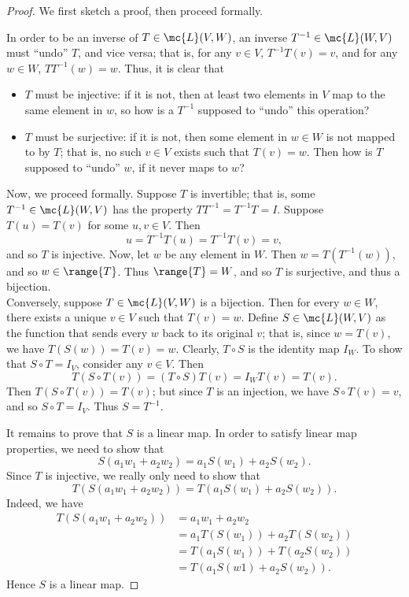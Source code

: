 \documentclass[math0540-lecture-notes.tex]{subfiles}
\begin{document}
\begin{proof}[Proof]
  We first sketch a proof, then proceed formally.

  In order to be an inverse of $T \in \mc{L}(V,W)$, an inverse $T ^{-1}\in \mc{L}(W,V)$ must
  ``undo'' $T$, and vice versa; that is, for any $v\in V$, $T^{-1}T(v)=v$, and for any $w\in W$,
  $TT^{-1}(w)=w$. Thus, it is clear that
  \begin{itemize}
    \item $T$ must be injective: if it is not, then at least two elements in $V$ map to the same
      element in $w$, so how is a $T^{-1}$ supposed to ``undo'' this operation?
    \item $T$ must be surjective: if it is not, then some element in $w\in W$ is not mapped to by
      $T$; that is, no such $v\in V$ exists such that $T(v)=w$. Then how is $T$ supposed to ``undo''
      $w$, if it never maps to $w$?
  \end{itemize}

  Now, we proceed formally. Suppose $T$ is invertible; that is, some $T^{-1}\in \mc{L}(W,V)$ has the
  property $TT^{-1}=T^{-1}T=I$. Suppose $T(u)=T(v)$ for some $u,v\in V$. Then \[
    u=T^{-1}T(u)=T^{-1}T(v)=v
  ,\] and so $T$ is injective. Now, let $w$ be any element in $W$. Then $w=T(T^{-1}(w))$, and so
  $w\in \range{T}$. Thus $\range{T}=W$, and so $T$ is surjective, and thus a bijection.\\

  Conversely, suppose $T\in \mc{L}(V,W)$ is a bijection. Then for every $w\in W$, there exists a
  unique $v\in V$ such that $T(v)=w$. Define $S\in \mc{L}(W,V)$ as the function that sends every
  $w$ back to its original $v$; that is, since $w=T(v)$, we have $T(S(w))=T(v)=w$. Clearly, $T\circ
  S$ is the identity map $I_W$. To show that $S\circ T=I_V$, consider any $v\in V$. Then \[
    T(S\circ T(v))=(T\circ S)T(v)=I_WT(v)=T(v)
  .\] Then $T(S\circ T(v))=T(v)$; but since $T$ is an injection, we have $S\circ T(v)=v$, and so
  $S\circ T=I_V$. Thus $S=T^{-1}$.

  It remains to prove that $S$ is a linear map. In order to satisfy linear map properties, we need
  to show that \[
    S(a_1w_1+a_2w_2)=a_1S(w_1)+a_2S(w_2)
  .\] Since $T$ is injective, we really only need to show that \[
    T(S(a_1w_1+a_2w_2))=T(a_1S(w_1)+a_2S(w_2))
  .\] Indeed, we have
  \begin{align*}
    T(S(a_1w_1+a_2w_2))&= a_1w_1+a_2w_2 \\
                       &= a_1T(S(w_1))+a_2T(S(w_2)) \\
                       &= T(a_1S(w_1))+T(a_2S(w_2)) \\
                       &= T(a_1S(w1)+a_2S(w_2))
  .\end{align*} Hence $S$ is a linear map.
\end{proof}
\end{document}
